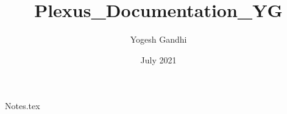 \documentclass{article}
\title{Plexus_Documentation_YG}
\author{Yogesh Gandhi}
\date{July 2021}
\begin{document}
{Notes.tex}
\end{document}
